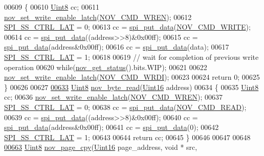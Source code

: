 \begin{DoxyCode}
00609 \{
00610     \hyperlink{a00072_af84840501dec18061d18a68c162a8fa2}{Uint8} cc;
00611     \hyperlink{a00060_a7b698f4b0088c4e28951c2204b7b821e}{nov\_set\_write\_enable\_latch}(\hyperlink{a00029_acc9f91a7c7d40a32755560dda080cf98}{NOV\_CMD\_WREN});
00612     \hyperlink{a00013_aa8b53e04161d178ebd9c01edf1584039}{SPI\_SS\_CTRL\_LAT} = 0;
00613     cc = \hyperlink{a00013_a19e2dff580e4d1b2198fa9108fca81ac}{spi\_put\_data}(\hyperlink{a00029_a031aab76ddb1258273541a65d70acbe1}{NOV\_CMD\_WRITE});
00614     cc = \hyperlink{a00013_a19e2dff580e4d1b2198fa9108fca81ac}{spi\_put\_data}((address>>8)&0x00ff);
00615     cc = \hyperlink{a00013_a19e2dff580e4d1b2198fa9108fca81ac}{spi\_put\_data}(address&0x00ff);
00616     cc = \hyperlink{a00013_a19e2dff580e4d1b2198fa9108fca81ac}{spi\_put\_data}(data);
00617     \hyperlink{a00013_aa8b53e04161d178ebd9c01edf1584039}{SPI\_SS\_CTRL\_LAT} = 1;
00618 
00619     \textcolor{comment}{// wait for completion of previous write operation}
00620     \textcolor{keywordflow}{while}(\hyperlink{a00060_af9ccbc198ed63feb4fd6c18dd934590d}{nov\_get\_status}().bits.WIP);
00621 
00622     \hyperlink{a00060_a7b698f4b0088c4e28951c2204b7b821e}{nov\_set\_write\_enable\_latch}(\hyperlink{a00029_a3924df5fbf1e1ff642a9bde06e17b69d}{NOV\_CMD\_WRDI});
00623 
00624     \textcolor{keywordflow}{return} 0;
00625 \}
00626 
00627 
\hypertarget{a00060_source_l00633}{}\hyperlink{a00060_adf5af9eb34f1cd301648dfa3c71fe392}{00633} \hyperlink{a00072_af84840501dec18061d18a68c162a8fa2}{Uint8} \hyperlink{a00060_adf5af9eb34f1cd301648dfa3c71fe392}{nov\_byte\_read}(\hyperlink{a00072_a59a9f6be4562c327cbfb4f7e8e18f08b}{Uint16} address)
00634 \{
00635     \hyperlink{a00072_af84840501dec18061d18a68c162a8fa2}{Uint8} cc;
00636     \hyperlink{a00060_a7b698f4b0088c4e28951c2204b7b821e}{nov\_set\_write\_enable\_latch}(\hyperlink{a00029_acc9f91a7c7d40a32755560dda080cf98}{NOV\_CMD\_WREN});
00637     \hyperlink{a00013_aa8b53e04161d178ebd9c01edf1584039}{SPI\_SS\_CTRL\_LAT} = 0;
00638     cc = \hyperlink{a00013_a19e2dff580e4d1b2198fa9108fca81ac}{spi\_put\_data}(\hyperlink{a00029_a9d4dca4a65e8cabd1d733922725309e4}{NOV\_CMD\_READ});
00639     cc = \hyperlink{a00013_a19e2dff580e4d1b2198fa9108fca81ac}{spi\_put\_data}((address>>8)&0x00ff);
00640     cc = \hyperlink{a00013_a19e2dff580e4d1b2198fa9108fca81ac}{spi\_put\_data}(address&0x00ff);
00641     cc = \hyperlink{a00013_a19e2dff580e4d1b2198fa9108fca81ac}{spi\_put\_data}(0);
00642     \hyperlink{a00013_aa8b53e04161d178ebd9c01edf1584039}{SPI\_SS\_CTRL\_LAT} = 1;
00643 
00644     \textcolor{keywordflow}{return} cc;
00645 \}
00646 
00647 
00648 
\hypertarget{a00060_source_l00663}{}\hyperlink{a00060_aeb021b0e002db120ad733c24f3e179bc}{00663} \hyperlink{a00072_af84840501dec18061d18a68c162a8fa2}{Uint8}  \hyperlink{a00060_aeb021b0e002db120ad733c24f3e179bc}{nov\_page\_cpy}(\hyperlink{a00072_a59a9f6be4562c327cbfb4f7e8e18f08b}{Uint16} page\_address, \textcolor{keywordtype}{void} * src,

\end{DoxyCode}
